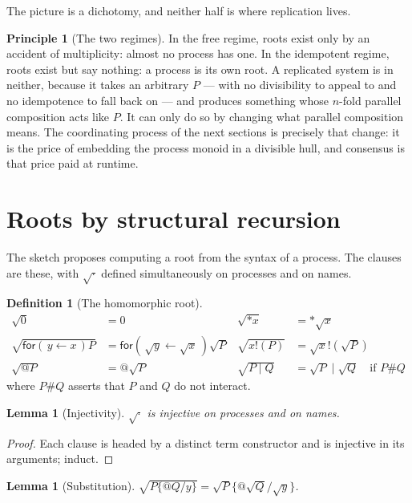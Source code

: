 \documentclass[11pt]{article}
\newtheorem{lemma}[theorem]{Lemma}
\theoremstyle{definition}
\newtheorem{definition}[theorem]{Definition}
\newtheorem{principle}[theorem]{Principle}
\newcommand{\In}[2]{\mathsf{for}(\,#1 \leftarrow #2\,)}
\newcommand{\rt}[1]{\sqrt{#1}}
\begin{document}
The picture is a dichotomy, and neither half is where replication lives.

\begin{principle}[The two regimes]
In the free regime, roots exist only by an accident of multiplicity: almost no process has one. In the idempotent regime, roots exist but say nothing: a process is its own root. A replicated system is in neither, because it takes an arbitrary $P$ --- with no divisibility to appeal to and no idempotence to fall back on --- and produces something whose $n$-fold parallel composition acts like $P$. It can only do so by changing what parallel composition means. The coordinating process of the next sections is precisely that change: it is the price of embedding the process monoid in a divisible hull, and consensus is that price paid at runtime.
\end{principle}

\section{Roots by structural recursion}\label{sec:homo}

The sketch proposes computing a root from the syntax of a process. The clauses are these, with $\rt{\cdot}$ defined simultaneously on processes and on names.

\begin{definition}[The homomorphic root]\label{def:homo}
\begin{align*}
  \rt{0} &= 0 &
  \rt{{*}x} &= {*}\rt{x} \\
  \rt{\In{y}{x}P} &= \In{\rt{y}}{\rt{x}}\rt{P} &
  \rt{x!(P)} &= \rt{x}!(\rt{P}) \\
  \rt{@P} &= @\rt{P} &
  \rt{P \mid Q} &= \rt{P} \mid \rt{Q} \quad \text{if } P \# Q
\end{align*}
where $P \# Q$ asserts that $P$ and $Q$ do not interact.
\end{definition}

\begin{lemma}[Injectivity]\label{lem:inj}
$\rt{\cdot}$ is injective on processes and on names.
\end{lemma}

\begin{proof}
Each clause is headed by a distinct term constructor and is injective in its arguments; induct.
\end{proof}

\begin{lemma}[Substitution]\label{lem:subst}
$\rt{P\{@Q/y\}} = \rt{P}\{@\rt{Q}/\rt{y}\}$.
\end{lemma}
\end{document}
